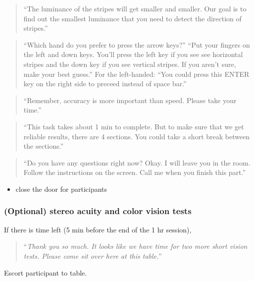 \documentclass[]{article}
\providecommand{\tightlist}{%
  \setlength{\itemsep}{0pt}\setlength{\parskip}{0pt}}
\begin{document}
\begin{quote}
``The luminance of the stripes will get smaller and smaller. Our goal is
to find out the smallest luminance that you need to detect the direction
of stripes.''
\end{quote}

\begin{quote}
``Which hand do you prefer to press the arrow keys?'' ``Put your fingers
on the left and down keys. You'll press the left key if you see see
horizontal stripes and the down key if you see vertical stripes. If you
aren't sure, make your best guess.'' For the left-handed: ``You could
press this ENTER key on the right side to preceed instead of space
bar.''
\end{quote}

\begin{quote}
``Remember, accuracy is more important than speed. Please take your
time.''
\end{quote}

\begin{quote}
``This task takes about 1 min to complete. But to make sure that we get
reliable results, there are 4 sections. You could take a short break
between the sections.''
\end{quote}

\begin{quote}
``Do you have any questions right now? Okay. I will leave you in the
room. Follow the instructions on the screen. Call me when you finish
this part.''
\end{quote}

\begin{itemize}
\tightlist
\item
  close the door for participants
\end{itemize}

\subsubsection{(Optional) stereo acuity and color vision
tests}\label{optional-stereo-acuity-and-color-vision-tests}

If there is time left (5 min before the end of the 1 hr session),

\begin{quote}
``\emph{Thank you so much. It looks like we have time for two more short
vision tests. Please come sit over here at this table.}''
\end{quote}

Escort participant to table.
\end{document}
